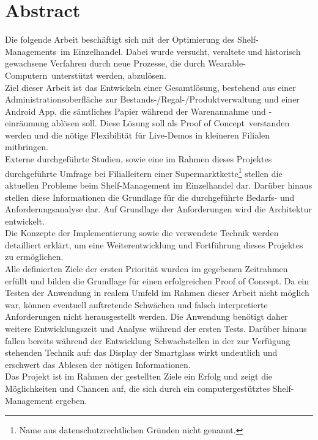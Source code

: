 \chapter*{Abstract} %

Die folgende Arbeit beschäftigt sich mit der Optimierung des \glqq Shelf-Managements\grqq~im Einzelhandel. Dabei wurde versucht, veraltete und historisch gewachsene Verfahren durch neue Prozesse, die durch \glqq Wearable-Computern\grqq~unterstützt werden, abzulösen.\\

Ziel dieser Arbeit ist das Entwickeln einer Gesamtlösung, bestehend aus einer Administrationsoberfläche zur Bestands-/Regal-/Produktverwaltung und einer Android App, die sämtliches Papier während der Warenannahme und -einräumung ablösen soll. Diese Lösung soll als \glqq Proof of Concept\grqq~verstanden werden und die nötige Flexibilität für Live-Demos in kleineren Filialen mitbringen.\\

Externe durchgeführte Studien, sowie eine im Rahmen dieses Projektes durchgeführte Umfrage bei Filialleitern einer Supermarktkette\footnote{Name aus datenschutzrechtlichen Gründen nicht genannt.} stellen die aktuellen Probleme beim Shelf-Management im Einzelhandel dar. Darüber hinaus stellen diese Informationen die Grundlage für die durchgeführte Bedarfs- und Anforderungsanalyse dar. Auf Grundlage der Anforderungen wird die Architektur entwickelt.\\

Die Konzepte der Implementierung sowie die verwendete Technik werden detailliert erklärt, um eine Weiterentwicklung und Fortführung dieses Projektes zu ermöglichen.\\

Alle definierten Ziele der ersten Priorität wurden im gegebenen Zeitrahmen erfüllt und bilden die Grundlage für einen erfolgreichen \glqq Proof of Concept\grqq . Da ein Testen der Anwendung in realem Umfeld im Rahmen dieser Arbeit nicht möglich war, können eventuell auftretende Schwächen und falsch interpretierte Anforderungen nicht herausgestellt werden. Die Anwendung benötigt daher weitere Entwicklungszeit und Analyse während der ersten Tests. Darüber hinaus fallen bereits während der Entwicklung Schwachstellen in der zur Verfügung stehenden Technik auf: das Display der Smartglass wirkt undeutlich und erschwert das Ablesen der nötigen Informationen.\\

Das Projekt ist im Rahmen der gestellten Ziele ein Erfolg und zeigt die Möglichkeiten und Chancen auf, die sich durch ein computergestütztes Shelf-Management ergeben.